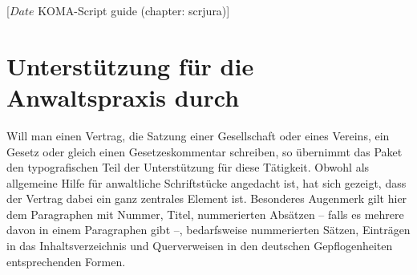 %
%
%
%
%
%
%
%
% 
%
%
%
%

%
                 [$Date$
                  KOMA-Script guide (chapter: scrjura)]

\chapter{Unterstützung für die Anwaltspraxis durch }
\BeginIndexGroup
{}

Will man einen Vertrag, die Satzung einer
Gesellschaft oder eines Vereins, ein Gesetz oder gleich einen
Gesetzeskommentar schreiben, so übernimmt das Paket  den
typografischen Teil der Unterstützung für diese Tätigkeit. Obwohl
 als allgemeine Hilfe für anwaltliche Schriftstücke angedacht
ist, hat sich gezeigt, dass der Vertrag dabei ein ganz zentrales Element
ist. Besonderes Augenmerk gilt hier dem
Paragraphen mit Nummer, Titel, nummerierten
Absätzen -- falls es mehrere davon in einem Paragraphen gibt --, bedarfsweise
nummerierten Sätzen, Einträgen in das Inhaltsverzeichnis und Querverweisen in
den deutschen Gepflogenheiten entsprechenden Formen.


